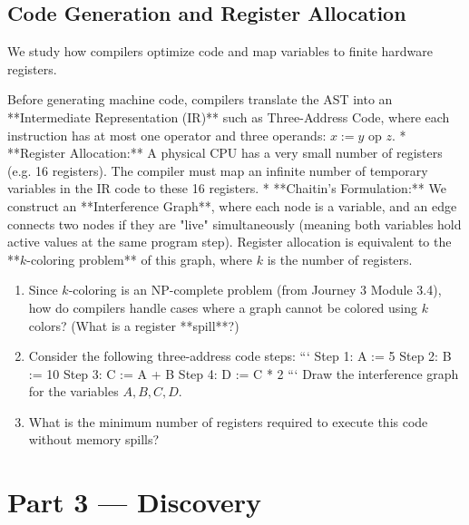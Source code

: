 \documentclass[12pt, a4paper]{book}
\begin{document}
\subsection{Code Generation and Register Allocation}

We study how compilers optimize code and map variables to finite hardware registers.

\begin{explobox}
Before generating machine code, compilers translate the AST into an **Intermediate Representation (IR)** such as Three-Address Code, where each instruction has at most one operator and three operands: $x := y \text{ op } z$.
* **Register Allocation:** A physical CPU has a very small number of registers (e.g. 16 registers). The compiler must map an infinite number of temporary variables in the IR code to these 16 registers.
* **Chaitin's Formulation:** We construct an **Interference Graph**, where each node is a variable, and an edge connects two nodes if they are "live" simultaneously (meaning both variables hold active values at the same program step). Register allocation is equivalent to the **$k$-coloring problem** of this graph, where $k$ is the number of registers.
\begin{enumerate}[label=(\alph*), leftmargin=*]
  \item Since $k$-coloring is an NP-complete problem (from Journey 3 Module 3.4), how do compilers handle cases where a graph cannot be colored using $k$ colors? (What is a register **spill**?)
  \item Consider the following three-address code steps:
        ```
          Step 1: A := 5
          Step 2: B := 10
          Step 3: C := A + B
          Step 4: D := C * 2
        ```
        Draw the interference graph for the variables $A, B, C, D$.
  \item What is the minimum number of registers required to execute this code without memory spills?
\end{enumerate}
\end{explobox}

\newpage

\section{Part 3 --- Discovery}
\end{document}
